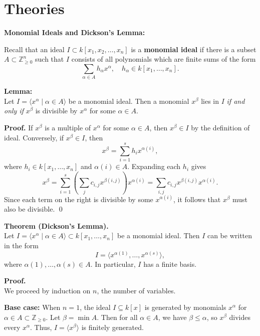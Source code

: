 \documentclass[11pt]{article}
\begin{document}
\section{Theories}
    \item[] \textbf{Monomial Ideals and Dickson's Lemma:}
    
    \item Recall that an ideal $I \subset k[x_1, x_2, \dots, x_n] $ is a \textbf{monomial ideal} if there is a subset $A \subset \mathbb{Z}_{\ge 0}^n$ such that $I$ consists of all polynomials which are finite sums of the form 
    \[
    \sum_{\alpha \in A} h_\alpha x^\alpha, \quad h_\alpha \in k[x_1, \dots, x_n].
    \]

    \textbf{Lemma:} \\
    Let $I = \langle x^\alpha \mid \alpha \in A\rangle$ be a monomial ideal. Then a monomial $x^\beta $ lies in $I$ \textit{if and only if} $x^\beta$ is divisible by $x^\alpha$ for some $\alpha \in A$.

    \textbf{Proof.} If \( x^\beta \) is a multiple of \( x^\alpha \) for some \( \alpha \in A \), then \( x^\beta \in I \) by the definition of ideal. Conversely, if \( x^\beta \in I \), then 
    \[
    x^\beta = \sum_{i=1}^{s} h_i x^{\alpha(i)},
    \]
    where \( h_i \in k[x_1, \dots, x_n] \) and \( \alpha(i) \in A \). Expanding each \( h_i \) gives
    \[
    x^\beta = \sum_{i=1}^{s} \left( \sum_{j} c_{i,j} x^{\beta(i,j)} \right) x^{\alpha(i)} = \sum_{i,j} c_{i,j} x^{\beta(i,j)} x^{\alpha(i)}.
    \]
    Since each term on the right is divisible by some \( x^{\alpha(i)} \), it follows that \( x^\beta \) must also be divisible. \qed

   \textbf{Theorem (Dickson’s Lemma).} \\
    Let $I = \langle x^\alpha \mid \alpha \in A \rangle \subset k[x_1, \dots, x_n]$ be a monomial ideal. Then $I$ can be written in the form 
    \[
    I = \langle x^{\alpha(1)}, \dots, x^{\alpha(s)} \rangle,
    \]
    where $\alpha(1), \dots, \alpha(s) \in A$. In particular, $I$ has a finite basis.
    
    \textbf{Proof.} \\
    We proceed by induction on $n$, the number of variables.
    
     \textbf{Base case:} When $n = 1$, the ideal $I \subseteq k[x]$ is generated by monomials $x^\alpha$ for $\alpha \in A \subset \mathbb{Z}_{\geq 0}$. Let $\beta = \min A$. Then for all $\alpha \in A$, we have $\beta \leq \alpha$, so $x^\beta$ divides every $x^\alpha$. Thus, $I = \langle x^\beta \rangle$ is finitely generated.
    
\end{document}
